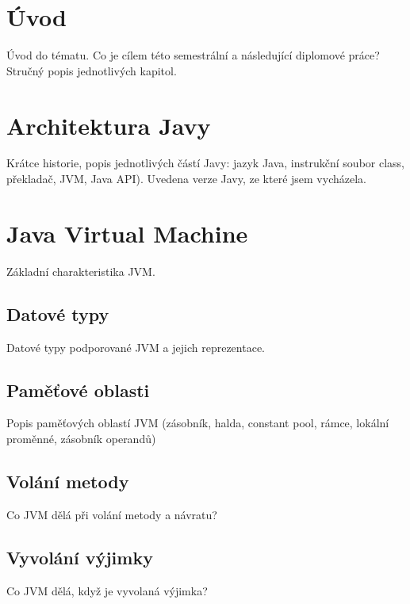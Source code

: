 
%
%


\chapter{Úvod}

Úvod do tématu. Co je cílem této semestrální a následující diplomové práce? Stručný popis jednotlivých kapitol.

\chapter{Architektura Javy}

Krátce historie, popis jednotlivých částí Javy: jazyk Java, instrukční soubor class, překladač, JVM, Java API).
Uvedena verze Javy, ze které jsem vycházela.

\chapter{Java Virtual Machine}

Základní charakteristika JVM.

\section{Datové typy}

Datové typy podporované JVM a jejich reprezentace.

\section{Paměťové oblasti}

Popis paměťových oblastí JVM (zásobník, halda, constant pool, rámce, lokální proměnné, zásobník operandů)

\section{Volání metody}

Co JVM dělá při volání metody a návratu?

\section{Vyvolání výjimky}

Co JVM dělá, když je vyvolaná výjimka?

